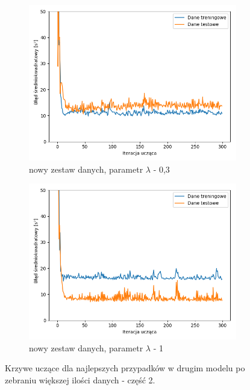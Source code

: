 \documentclass[12pt]{aghdpl}
\begin{document}
		\begin{figure}[h]
			\centering
		 	\begin{subfigure}{.8\linewidth}
		 		\includegraphics[width =\linewidth]{wykresy/8_zebranie_wiekszej_ilosci_danych/200-400/regularyzacja_0_3_wykres_uczenia.png}
		 		\caption{nowy zestaw danych, parametr $\lambda$ - 0,3}
		 	\end{subfigure}
		 	\begin{subfigure}{.8\linewidth}
		 		\includegraphics[width =\linewidth]{wykresy/8_zebranie_wiekszej_ilosci_danych/200-400/regularyzacja_1_wykres_uczenia.png}
		 		\caption{nowy zestaw danych, parametr $\lambda$ - 1}
		 	\end{subfigure}
		 	
		 	\caption{Krzywe uczące dla najlepszych przypadków w drugim modelu po zebraniu większej ilości danych - część 2.}
			\label{fig: drugi_model_po_zebraniu_wiekszej_ilosci_danych_wykresy_uczenia_2}
		\end{figure}
		
\end{document}
